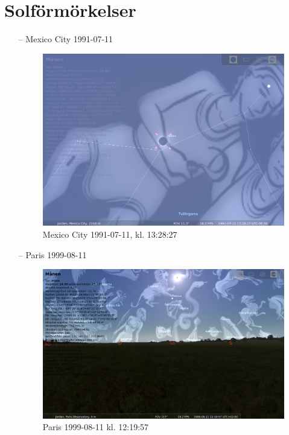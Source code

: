 \documentclass[./exercises.tex]{subfiles}
\begin{document}
\section{Solförmörkelser}

\begin{itemize}
    \item[--] Mexico City 1991-07-11
\begin{figure}[H]
\centering
  \includegraphics[scale=0.34]{stellarium-032.png}
  \caption{Mexico City 1991-07-11, kl. 13:28:27}
  \label{fig4}
\end{figure}


\item[--] Paris 1999-08-11
\begin{figure}[H]
\centering
  \includegraphics[scale=0.3]{stellarium-033.png}
  \caption{Paris 1999-08-11 kl. 12:19:57 }
  \label{fig4}
\end{figure}

\end{itemize}
\end{document}
